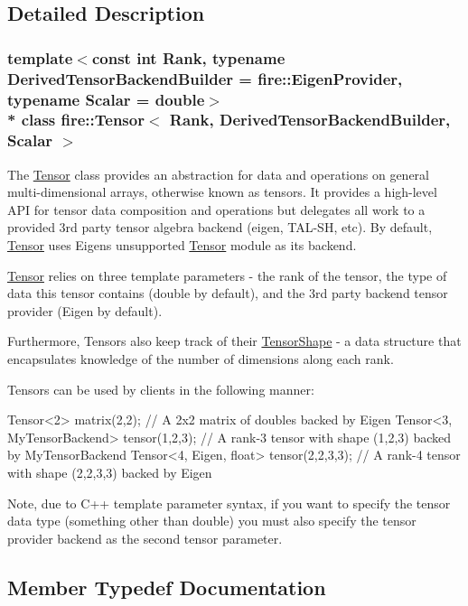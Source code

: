 \subsection{Detailed Description}
\subsubsection*{template$<$const int Rank, typename Derived\+Tensor\+Backend\+Builder = fire\+::\+Eigen\+Provider, typename Scalar = double$>$\\*
class fire\+::\+Tensor$<$ Rank, Derived\+Tensor\+Backend\+Builder, Scalar $>$}

The \hyperlink{a00299}{Tensor} class provides an abstraction for data and operations on general multi-\/dimensional arrays, otherwise known as tensors. It provides a high-\/level A\+PI for tensor data composition and operations but delegates all work to a provided 3rd party tensor algebra backend (eigen, T\+A\+L-\/\+SH, etc). By default, \hyperlink{a00299}{Tensor} uses Eigen\textquotesingle{}s unsupported \hyperlink{a00299}{Tensor} module as its backend.

\hyperlink{a00299}{Tensor} relies on three template parameters -\/ the rank of the tensor, the type of data this tensor contains (double by default), and the 3rd party backend tensor provider (Eigen by default).

Furthermore, Tensors also keep track of their \hyperlink{a00301}{Tensor\+Shape} -\/ a data structure that encapsulates knowledge of the number of dimensions along each rank.

Tensors can be used by clients in the following manner\+:


\begin{DoxyCode}
Tensor<2> matrix(2,2); \textcolor{comment}{// A 2x2 matrix of doubles backed by Eigen}
Tensor<3, MyTensorBackend> tensor(1,2,3); \textcolor{comment}{// A rank-3 tensor with shape (1,2,3) backed by MyTensorBackend}
Tensor<4, Eigen, float> tensor(2,2,3,3); \textcolor{comment}{// A rank-4 tensor with shape (2,2,3,3) backed by Eigen}
\end{DoxyCode}


Note, due to C++ template parameter syntax, if you want to specify the tensor data type (something other than double) you must also specify the tensor provider backend as the second tensor parameter. 

\subsection{Member Typedef Documentation}
